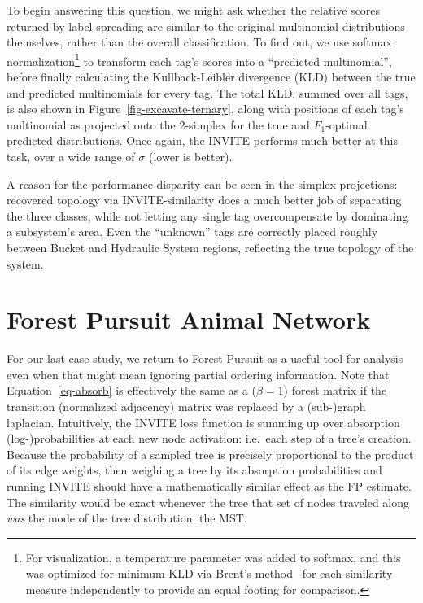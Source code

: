 \documentclass[%
	12pt,
		oneside,
		letterpaper
]{book}
\begin{document}
To begin answering this question, we might ask whether the relative
scores returned by label-spreading are similar to the original
multinomial distributions themselves, rather than the overall
classification. To find out, we use softmax normalization\footnote{For
  visualization, a temperature parameter was added to softmax, and this
  was optimized for minimum KLD via Brent's
  method~\autocite{algorithmguaranteedconvergence_Brent1971} for each
  similarity measure independently to provide an equal footing for
  comparison.} to transform each tag's scores into a ``predicted
multinomial'', before finally calculating the Kullback-Leibler
divergence (KLD) between the true and predicted multinomials for every
tag. The total KLD, summed over all tags, is also shown in
Figure~\ref{fig-excavate-ternary}, along with positions of each tag's
multinomial as projected onto the 2-simplex for the true and
\(F_1\)-optimal predicted distributions. Once again, the INVITE performs
much better at this task, over a wide range of \(\sigma\) (lower is
better).

A reason for the performance disparity can be seen in the simplex
projections: recovered topology via INVITE-similarity does a much better
job of separating the three classes, while not letting any single tag
overcompensate by dominating a subsystem's area. Even the ``unknown''
tags are correctly placed roughly between Bucket and Hydraulic System
regions, reflecting the true topology of the system.

\section{Forest Pursuit Animal Network}\label{sec-animal-fluency}

For our last case study, we return to Forest Pursuit as a useful tool
for analysis even when that might mean ignoring partial ordering
information. Note that Equation~\ref{eq-absorb} is effectively the same
as a (\(\beta=1\)) forest matrix if the transition (normalized
adjacency) matrix was replaced by a (sub-)graph laplacian. Intuitively,
the INVITE loss function is summing up over absorption
(log-)probabilities at each new node activation: i.e.~each step of a
tree's creation. Because the probability of a sampled tree is precisely
proportional to the product of its edge weights, then weighing a tree by
its absorption probabilities and running INVITE should have a
mathematically similar effect as the FP estimate. The similarity would
be exact whenever the tree that set of nodes traveled along \emph{was}
the mode of the tree distribution: the MST.
\end{document}
